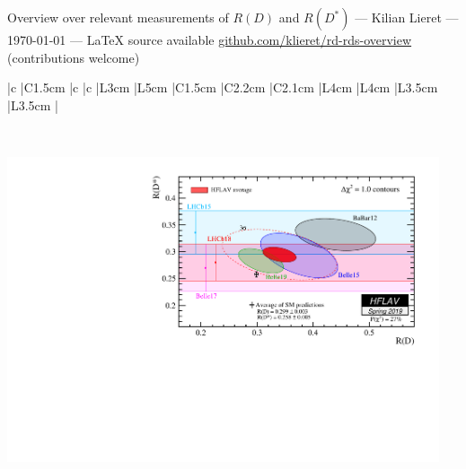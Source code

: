 


    \thispagestyle{empty}
    \begin{center}\Large
        Overview over relevant measurements of $R(D)$ and $R(D^*)$
        --- Kilian Lieret
        --- \today 
        --- \LaTeX{} source available \url{github.com/klieret/rd-rds-overview} (contributions welcome)
    \end{center}
    
    \begin{center}
        \begin{tabular}{
                |c %
                |C{1.5cm} %
                |c %
                |c %
                |L{3cm} %
                |L{5cm} %
                |C{1.5cm} %
                |C{2.2cm} %
                |C{2.1cm} %
                |L{4cm} %
                |L{4cm} %
                |L{3.5cm} %
                |L{3.5cm} %
                |
                }
            \hline\hline
            
            \\\hline\hline
        \end{tabular}
    \end{center}
    
    \vspace{1cm}
    \includegraphics[height=9cm]{fig/hflav.pdf}
    

